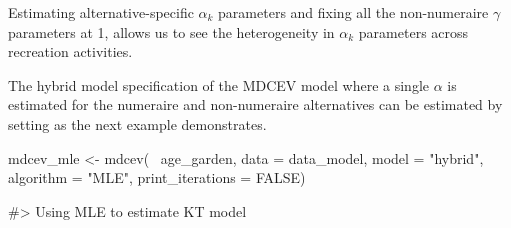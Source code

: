 Estimating alternative-specific \(\alpha_k\) parameters and fixing all
the non-numeraire \(\gamma\) parameters at 1, allows us to see the
heterogeneity in \(\alpha_k\) parameters across recreation activities.

The hybrid model specification of the MDCEV model where a single
\(\alpha\) is estimated for the numeraire and non-numeraire alternatives
can be estimated by setting  as the next example
demonstrates.

\begin{example}
mdcev_mle <- mdcev(~ age_garden,
                  data = data_model,
                  model = "hybrid",
                  algorithm = "MLE",
                  print_iterations = FALSE)

#> Using MLE to estimate KT model
\end{example}

